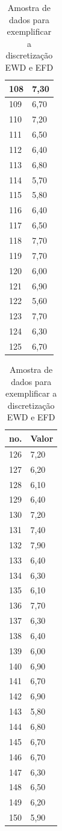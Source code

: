 \begin{table}[!ht]
\begin{tabular}{ |l|l| }
108	&	7,30	\\ \hline
109	&	6,70	\\ \hline
110	&	7,20	\\ \hline
111	&	6,50	\\ \hline
112	&	6,40	\\ \hline
113	&	6,80	\\ \hline
114	&	5,70	\\ \hline
115	&	5,80	\\ \hline
116	&	6,40	\\ \hline
117	&	6,50	\\ \hline
118	&	7,70	\\ \hline
119	&	7,70	\\ \hline
120	&	6,00	\\ \hline
121	&	6,90	\\ \hline
122	&	5,60	\\ \hline
123	&	7,70	\\ \hline
124	&	6,30	\\ \hline
125	&	6,70	\\ \hline
\end{tabular}
\begin{tabular}{ |l|l| }
\hline
 no. & Valor \\ \hline
126	&	7,20	\\ \hline
127	&	6,20	\\ \hline
128	&	6,10	\\ \hline
129	&	6,40	\\ \hline
130	&	7,20	\\ \hline
131	&	7,40	\\ \hline
132	&	7,90	\\ \hline
133	&	6,40	\\ \hline
134	&	6,30	\\ \hline
135	&	6,10	\\ \hline
136	&	7,70	\\ \hline
137	&	6,30	\\ \hline
138	&	6,40	\\ \hline
139	&	6,00	\\ \hline
140	&	6,90	\\ \hline
141	&	6,70	\\ \hline
142	&	6,90	\\ \hline
143	&	5,80	\\ \hline
144	&	6,80	\\ \hline
145	&	6,70	\\ \hline
146	&	6,70	\\ \hline
147	&	6,30	\\ \hline
148	&	6,50	\\ \hline
149	&	6,20	\\ \hline
150	&	5,90	\\ \hline

\end{tabular}
\caption{Amostra de dados para exemplificar a discretização EWD e EFD}
\label{tab:amostraDiscret}
\end{table}

